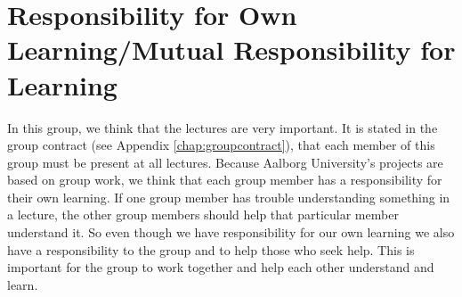 \section{Responsibility for Own Learning/Mutual Responsibility for Learning}
In this group, we think that the lectures are very important. It is stated in the group contract (see Appendix \ref{chap:groupcontract}), that each member of this group must be present at all lectures. Because Aalborg University's projects are based on group work, we think that each group member has a responsibility for their own learning. If one group member has trouble understanding something in a lecture, the other group members should help that particular member understand it. So even though we have responsibility for our own learning we also have a responsibility to the group and to help those who seek help. This is important for the group to work together and help each other understand and learn.
